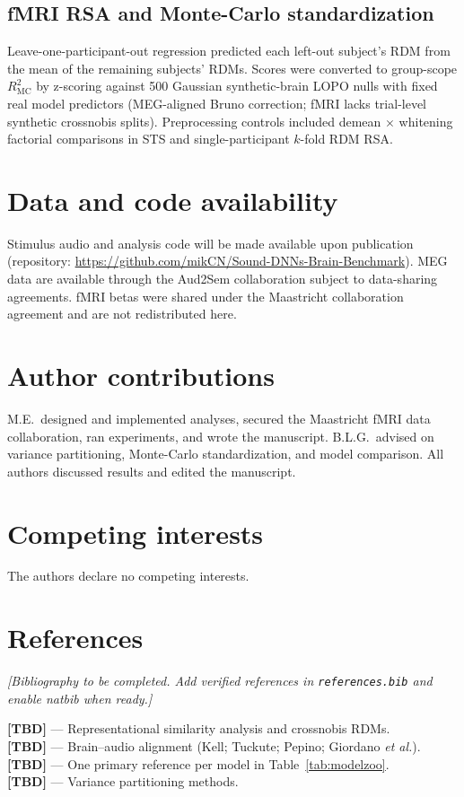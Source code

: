 \documentclass[11pt,a4paper]{article}
\begin{document}
\subsection{fMRI RSA and Monte-Carlo standardization}
Leave-one-participant-out regression predicted each left-out subject's RDM from the mean of the remaining subjects' RDMs. Scores were converted to group-scope $R^2_{\mathrm{MC}}$ by z-scoring against 500 Gaussian synthetic-brain LOPO nulls with fixed real model predictors (MEG-aligned Bruno correction; fMRI lacks trial-level synthetic crossnobis splits). Preprocessing controls included demean $\times$ whitening factorial comparisons in STS and single-participant $k$-fold RDM RSA.

\section{Data and code availability}

Stimulus audio and analysis code will be made available upon publication (repository: \url{https://github.com/mikCN/Sound-DNNs-Brain-Benchmark}). MEG data are available through the Aud2Sem collaboration subject to data-sharing agreements. fMRI betas were shared under the Maastricht collaboration agreement and are not redistributed here.

\section*{Author contributions}
M.E.\ designed and implemented analyses, secured the Maastricht fMRI data collaboration, ran experiments, and wrote the manuscript. B.L.G.\ advised on variance partitioning, Monte-Carlo standardization, and model comparison. All authors discussed results and edited the manuscript.

\section*{Competing interests}
The authors declare no competing interests.

\section*{References}

\textit{[Bibliography to be completed. Add verified references in \texttt{references.bib} and enable natbib when ready.]}

\noindent
\textbf{[TBD]} --- Representational similarity analysis and crossnobis RDMs.\\
\textbf{[TBD]} --- Brain--audio alignment (Kell; Tuckute; Pepino; Giordano \textit{et al.}).\\
\textbf{[TBD]} --- One primary reference per model in Table~\ref{tab:modelzoo}.\\
\textbf{[TBD]} --- Variance partitioning methods.
\end{document}

